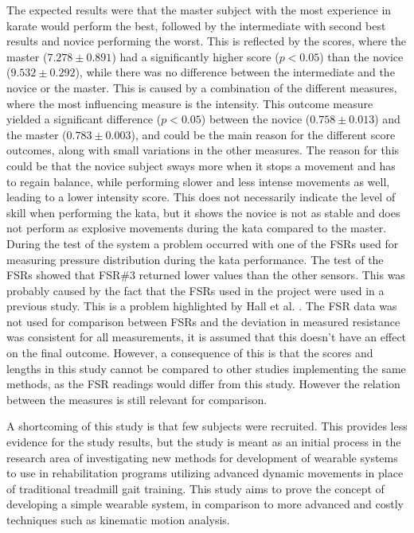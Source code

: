 
The expected results were that the master subject with the most experience in karate would perform the best, followed by the intermediate with second best results and novice performing the worst. This is reflected by the scores, where the master ($7.278 \pm 0.891$) had a significantly higher score ($p<0.05$) than the novice ($9.532 \pm 0.292$), while there was no difference between the intermediate and the novice or the master. This is caused by a combination of the different measures, where the most influencing measure is the intensity. This outcome measure yielded a significant difference ($p<0.05$) between the novice ($0.758 \pm 0.013$) and the master ($0.783 \pm 0.003$), and could be the main reason for the different score outcomes, along with small variations in the other measures. The reason for this could be that the novice subject sways more when it stops a movement and has to regain balance, while performing slower and less intense movements as well, leading to a lower intensity score. This does not necessarily indicate the level of skill when performing the kata, but it shows the novice is not as stable and does not perform as explosive movements during the kata compared to the master.
During the test of the system a problem occurred with one of the FSRs used for measuring pressure distribution during the kata performance. The test of the FSRs showed that FSR\#3 returned lower values than the other sensors. This was probably caused by the fact that the FSRs used in the project were used in a previous study. This is a problem highlighted by Hall et al. \cite{Hall2008}. The FSR data was not used for comparison between FSRs and the deviation in measured resistance was consistent for all measurements, it is assumed that this doesn’t have an effect on the final outcome. However, a consequence of this is that the scores and lengths in this study cannot be compared to other studies implementing the same methods, as the FSR readings would differ from this study. However the relation between the measures is still relevant for comparison.

A shortcoming of this study is that few subjects were recruited. This provides less evidence for the study results, but the study is meant as an initial process in the research area of investigating new methods for development of wearable systems to use in rehabilitation programs utilizing advanced dynamic movements in place of traditional treadmill gait training. This study aims to prove the concept of developing a simple wearable system, in comparison to more advanced and costly techniques such as kinematic motion analysis. 

